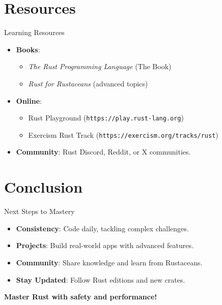 \documentclass[10pt]{beamer}
\begin{document}
\section{Resources}
\begin{frame}{Learning Resources}
    \begin{itemize}
        \item \textbf{Books}:
            \begin{itemize}
                \item \textit{The Rust Programming Language} (The Book)
                \item \textit{Rust for Rustaceans} (advanced topics)
            \end{itemize}
        \item \textbf{Online}:
            \begin{itemize}
                \item Rust Playground (\texttt{https://play.rust-lang.org})
                \item Exercism Rust Track (\texttt{https://exercism.org/tracks/rust})
            \end{itemize}
        \item \textbf{Community}: Rust Discord, Reddit, or X communities.
    \end{itemize}
\end{frame}

\section{Conclusion}
\begin{frame}{Next Steps to Mastery}
    \begin{itemize}
        \item \textbf{Consistency}: Code daily, tackling complex challenges.
        \item \textbf{Projects}: Build real-world apps with advanced features.
        \item \textbf{Community}: Share knowledge and learn from Rustaceans.
        \item \textbf{Stay Updated}: Follow Rust editions and new crates.
    \end{itemize}
    \vfill
    \centering
    \textbf{Master Rust with safety and performance!} \faSmileO
\end{frame}
\end{document}
